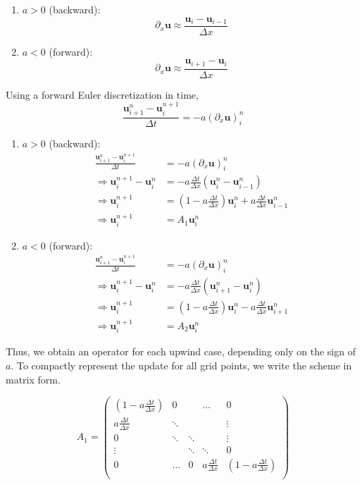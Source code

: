 \begin{enumerate}
    \item{$a > 0$ (backward): $$\partial_x \bm{u} \approx \frac{\bm{u}_i 
    - \bm{u}_{i-1}}{\Delta x} $$}
    \item{$a < 0$ (forward): $$\partial_x \bm{u} \approx \frac
    {\bm{u}_{i+1} - \bm{u}_{i}}{\Delta x} $$}
\end{enumerate}

Using a forward Euler discretization in time,
$$\frac{\bm{u}_{i+1}^n - \bm{u}_{i}^{n+1}}{\Delta t} 
= -a(\partial_x\bm{u})^n_i $$

\begin{enumerate}
\item $a > 0$ (backward):
\begin{align}
\frac{\bm{u}_{i+1}^n - \bm{u}_{i}^{n+1}}{\Delta t}
  &= -a(\partial_x \bm{u})^n_i \\
\Rightarrow \bm{u}_i^{n+1} - \bm{u}_i^n
  &= -a \frac{\Delta t}{\Delta x}(\bm{u}_i^n - \bm{u}_{i-1}^n) \\
\Rightarrow \bm{u}_i^{n+1}
  &= \left(1 - a\frac{\Delta t}{\Delta x}\right)\bm{u}_i^n
     + a\frac{\Delta t}{\Delta x}\bm{u}_{i-1}^n \\
\Rightarrow \bm{u}_i^{n+1}
  &= A_1 \bm{u}_i^n
\end{align}

\item $a < 0$ (forward):
\begin{align}
\frac{\bm{u}_{i+1}^n - \bm{u}_{i}^{n+1}}{\Delta t}
  &= -a(\partial_x \bm{u})^n_i \\
\Rightarrow \bm{u}_i^{n+1} - \bm{u}_i^n
  &= -a \frac{\Delta t}{\Delta x}(\bm{u}_{i+1}^n - \bm{u}_i^n) \\
\Rightarrow \bm{u}_i^{n+1}
  &= \left(1 - a\frac{\Delta t}{\Delta x}\right)\bm{u}_i^n
     - a\frac{\Delta t}{\Delta x}\bm{u}_{i+1}^n \\
\Rightarrow \bm{u}_i^{n+1}
  &= A_2 \bm{u}_i^n
\end{align}
\end{enumerate}

Thus, we obtain an operator for each upwind case, depending only on the
sign of $a$. To compactly represent the update for all grid points, we
write the scheme in matrix form.

$$ 
A_1 = \begin{pmatrix}
 \left(1-a\frac{\Delta t}{\Delta x}\right) & 0 &  & \dots & 0 \\
 a\frac{\Delta t}{\Delta x} & \ddots &  & & \vdots \\
 0 & \ddots & \ddots & & \vdots \\
 \vdots & & \ddots & \ddots & 0 \\
 0 & \dots & 0 & a\frac{\Delta t}{\Delta x} & \left(
    1-a\frac{\Delta t}{\Delta x}\right) \\
\end{pmatrix} $$


